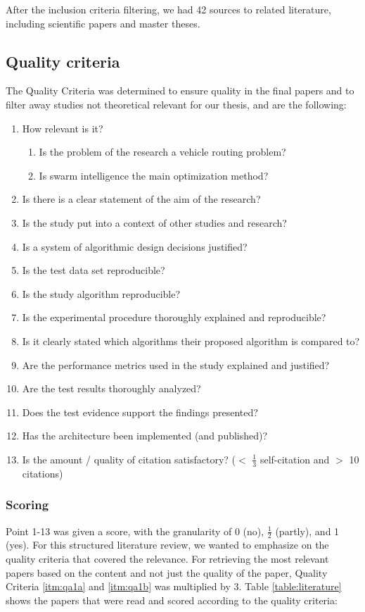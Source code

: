 After the inclusion criteria filtering, we had 42 sources to related literature, including scientific papers and master theses. 

\subsection{Quality criteria} 
The Quality Criteria was determined to ensure quality in the final papers and to filter away studies not theoretical relevant for our thesis, and are the following:
\begin{enumerate}
\item \label{itm:qa1}How relevant is it?
\begin{enumerate}
\item \label{itm:qa1a}Is the problem of the research a vehicle routing problem?
\item \label{itm:qa1b}Is swarm intelligence the main optimization method? 
\end{enumerate}
\item Is there is a clear statement of the aim of the research?
\item Is the study put into a context of other studies and research?
\item Is a system of algorithmic design decisions justified?
\item Is the test data set reproducible?
\item Is the study algorithm reproducible?
\item Is the experimental procedure thoroughly explained and reproducible?
\item Is it clearly stated which algorithms their proposed algorithm is compared to?
\item Are the performance metrics used in the study explained and justified?
\item Are the test results thoroughly analyzed?
\item Does the test evidence support the findings presented?
\item Has the architecture been implemented (and published)?
\item Is the amount / quality of citation satisfactory? ($<$ $\frac{1}{3}$  self-citation and $>$ 10 citations)
\end{enumerate}

\subsubsection{Scoring}
Point 1-13 was given a score, with the granularity of 0 (no), $\frac{1}{2}$ (partly), and 1 (yes). For this structured literature review, we wanted to emphasize on the quality criteria that covered the relevance. For retrieving the most relevant papers based on the content and not just the quality of the paper, Quality Criteria \vref{itm:qa1a} and \vref{itm:qa1b} was multiplied by 3. Table \vref{table:literature} shows the papers that were read and scored according to the quality criteria: 

